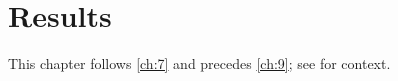 \chapter{Results}\label{ch:8}
\lipsum[110-112]

This chapter follows \cref{ch:7} and precedes \cref{ch:9}; see \citep{main-1,main-3} for context.
